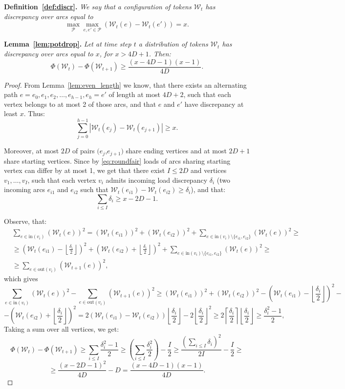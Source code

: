\documentclass{article}[11pt,letter]
\newcommand{\inedg}{\mathrm{in}}
\newcommand{\outedg}{\mathrm{out}}
\newcommand{\wload}{\mathcal{W}}
\begin{document}
\noindent\textbf{Definition~\ref{def:discr}.}
\emph{We say that a configuration of tokens $\wload_t$ has discrepancy over arcs equal to $$\max_{\mathcal{P}} \max_{e,e' \in \mathcal{P}} (\wload_t(e) - \wload_t(e'))= x.$$}

\noindent\textbf{Lemma~\ref{lem:potdrop}.}
\emph{Let at time step $t$ a distribution of tokens $\mathcal{W}_t$ has discrepancy over arcs equal to $x$, for $x>4D+1$. Then:
$$\Phi(\wload_t) - \Phi(\wload_{t+1}) \ge \frac{(x-4D-1)(x-1)}{4D}.$$}


\begin{proof}
From Lemma~\ref{lem:even_length} we know, that there exists an alternating path $e=e_0,e_1,e_2,\ldots ,e_{h-1},e_h=e'$ of length at most $4D+2$, such that each vertex belongs to at most 2 of those arcs, and that $e$ and $e'$ have discrepancy at least $x$. Thus:
$$\sum_{j = 0}^{h-1} |\wload_t(e_j)-\wload_t(e_{j+1})| \ge x.$$

Moreover, at most $2D$ of pairs $(e_j$,$e_{j+1})$ share ending vertices and at most $2D+1$ share starting vertices. Since by \eqref{eq:roundfair} loads of arcs sharing starting vertex can differ by at most 1, we get that there exist $I \le 2D$ and vertices $v_1,\ldots,v_{I}$, such that each vertex $v_i$ admits incoming load discrepancy $\delta_i$ (two incoming arcs $e_{i1}$ and $e_{i2}$ such that $\wload_t(e_{i1})-\wload_t(e_{i2}) \ge \delta_i$), and that:
$$\sum_{i\le I} \delta_i \ge x-2D-1.$$

Observe, that:
\begin{align*}
&\sum_{e \in \inedg(v_i)} (\wload_t(e))^2 = (\wload_t(e_{i1}))^2+(\wload_t(e_{i2}))^2+\sum_{e \in \inedg(v_i)\setminus\{e_{i1},e_{i2}\}} (\wload_t(e))^2 \ge\\
&\ge \left(\wload_t(e_{i1})-\left\lfloor\frac{\delta_i}{2}\right\rfloor\right)^2+\left(\wload_t(e_{i2})+\left\lfloor\frac{\delta_i}{2}\right\rfloor\right)^2 + \sum_{e \in \inedg(v_i)\setminus\{e_{i1},e_{i2}\}} (\wload_t(e))^2 \ge\\
&\ge \sum_{e \in \outedg(v_i)} (\wload_{t+1}(e))^2,
\end{align*}
which gives
$$\sum_{e \in \inedg(v_i)} (\wload_t(e))^2 - \sum_{e \in \outedg(v_i)} (\wload_{t+1}(e))^2 \ge (\wload_t(e_{i1}))^2+(\wload_t(e_{i2}))^2-\left(\wload_t(e_{i1})-\left\lfloor\frac{\delta_i}{2}\right\rfloor\right)^2-$$
$$-\left(\wload_t(e_{i2})+\left\lfloor\frac{\delta_i}{2}\right\rfloor\right)^2=
2\left(\wload_t(e_{i1})-\wload_t(e_{i2})\right)\left\lfloor\frac{\delta_i}{2}\right\rfloor-2\left\lfloor\frac{\delta_i}{2}\right\rfloor^2 \ge 2 \left\lceil\frac{\delta_i}{2}\right\rceil\left\lfloor\frac{\delta_i}{2}\right\rfloor \ge \frac{\delta_i^2-1}{2},$$
Taking a sum over all vertices, we get:
$$\Phi(\wload_t) - \Phi(\wload_{t+1}) \ge \sum_{i \le I} \frac{\delta_i^2-1}{2} \ge \left(\sum_{i \le I} \frac{\delta_i^2}{2}\right)  - \frac{I}{2} \ge \frac{(\sum_{i \le I} \delta_i)^2}{2I}-\frac{I}{2} \ge $$
$$\ge\frac{(x-2D-1)^2}{4D} - D=\frac{(x-4D-1)(x-1)}{4D}.$$

\end{proof}
\end{document}
